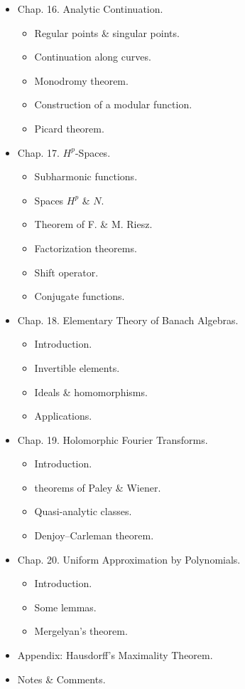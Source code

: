 \documentclass{article}
\begin{document}
\begin{itemize}
\begin{itemize}
		\item {\sf Chap. 16. Analytic Continuation.}
		\begin{itemize}
			\item {\sf Regular points \& singular points.}
			\item {\sf Continuation along curves.}
			\item {\sf Monodromy theorem.}
			\item {\sf Construction of a modular function.}
			\item {\sf Picard theorem.}
		\end{itemize}
		\item {\sf Chap. 17. $H^p$-Spaces.}
		\begin{itemize}
			\item {\sf Subharmonic functions.}
			\item {\sf Spaces $H^p$ \& $N$.}
			\item {\sf Theorem of F. \& M. Riesz.}
			\item {\sf Factorization theorems.}
			\item {\sf Shift operator.}
			\item {\sf Conjugate functions.}
		\end{itemize}
		\item {\sf Chap. 18. Elementary Theory of Banach Algebras.}
		\begin{itemize}
			\item {\sf Introduction.}
			\item {\sf Invertible elements.}
			\item {\sf Ideals \& homomorphisms.}
			\item {\sf Applications.}
		\end{itemize}
		\item {\sf Chap. 19. Holomorphic Fourier Transforms.}
		\begin{itemize}
			\item {\sf Introduction.}
			\item { theorems of Paley \& Wiener.}
			\item {\sf Quasi-analytic classes.}
			\item {\sf Denjoy--Carleman theorem.}
		\end{itemize}
		\item {\sf Chap. 20. Uniform Approximation by Polynomials.}
		\begin{itemize}
			\item {\sf Introduction.}
			\item {\sf Some lemmas.}
			\item {\sf Mergelyan's theorem.}
		\end{itemize}
		\item {\sf Appendix: Hausdorff's Maximality Theorem.}
		\item {\sf Notes \& Comments.}
	\end{itemize}
\end{itemize}
\end{document}
